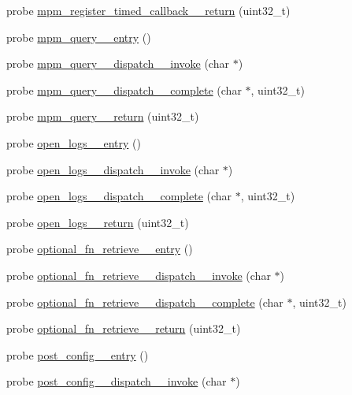 \begin{DoxyCompactItemize}
\item 
probe \hyperlink{apache__probes_8d_a4b6caf636c5a8cd6450fae66ac106875}{mpm\+\_\+register\+\_\+timed\+\_\+callback\+\_\+\+\_\+return} (uint32\+\_\+t)
\item 
probe \hyperlink{apache__probes_8d_ab629a24b8041b0925c7e1ac2ed86e37b}{mpm\+\_\+query\+\_\+\+\_\+entry} ()
\item 
probe \hyperlink{apache__probes_8d_af427058db4145b8d6d84665028665360}{mpm\+\_\+query\+\_\+\+\_\+dispatch\+\_\+\+\_\+invoke} (char $\ast$)
\item 
probe \hyperlink{apache__probes_8d_a62c527743d6a072d75d536afac9b2035}{mpm\+\_\+query\+\_\+\+\_\+dispatch\+\_\+\+\_\+complete} (char $\ast$, uint32\+\_\+t)
\item 
probe \hyperlink{apache__probes_8d_a0f86e18ead59f7e7a34bedc519044001}{mpm\+\_\+query\+\_\+\+\_\+return} (uint32\+\_\+t)
\item 
probe \hyperlink{apache__probes_8d_af784acaa88ed985a78797415702c698f}{open\+\_\+logs\+\_\+\+\_\+entry} ()
\item 
probe \hyperlink{apache__probes_8d_a5d2feae4780090b7da8acb1ae1b7ed6e}{open\+\_\+logs\+\_\+\+\_\+dispatch\+\_\+\+\_\+invoke} (char $\ast$)
\item 
probe \hyperlink{apache__probes_8d_a5af8ab569cde354d1939b5ff6d32129f}{open\+\_\+logs\+\_\+\+\_\+dispatch\+\_\+\+\_\+complete} (char $\ast$, uint32\+\_\+t)
\item 
probe \hyperlink{apache__probes_8d_af620a45838cbabf4b345bc48dc50282e}{open\+\_\+logs\+\_\+\+\_\+return} (uint32\+\_\+t)
\item 
probe \hyperlink{apache__probes_8d_a8beb6dde363738fdac06bc527ec40801}{optional\+\_\+fn\+\_\+retrieve\+\_\+\+\_\+entry} ()
\item 
probe \hyperlink{apache__probes_8d_a3e87318d4e3c1e10527e526cd4eb98d9}{optional\+\_\+fn\+\_\+retrieve\+\_\+\+\_\+dispatch\+\_\+\+\_\+invoke} (char $\ast$)
\item 
probe \hyperlink{apache__probes_8d_a4bed8ed257e9ee8948d2ea23afa4f307}{optional\+\_\+fn\+\_\+retrieve\+\_\+\+\_\+dispatch\+\_\+\+\_\+complete} (char $\ast$, uint32\+\_\+t)
\item 
probe \hyperlink{apache__probes_8d_a3b3c1a5a981d8571cf018ae29a3c6f0a}{optional\+\_\+fn\+\_\+retrieve\+\_\+\+\_\+return} (uint32\+\_\+t)
\item 
probe \hyperlink{apache__probes_8d_a57e29c8585b9e2953ef74fa61cd0d269}{post\+\_\+config\+\_\+\+\_\+entry} ()
\item 
probe \hyperlink{apache__probes_8d_a83fa513d6849596b83402b23998458ea}{post\+\_\+config\+\_\+\+\_\+dispatch\+\_\+\+\_\+invoke} (char $\ast$)

\end{DoxyCompactItemize}
